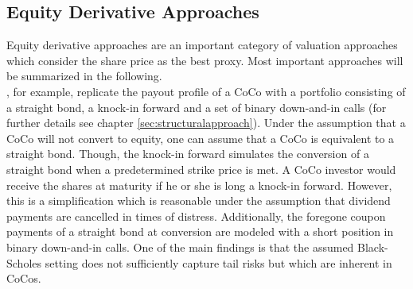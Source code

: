 
\subsection*{Equity Derivative Approaches}
Equity derivative approaches are an important category of valuation approaches which consider the share price as the best proxy. Most important approaches will be summarized in the following.\\

\citet{de2011pricing}, for example, replicate the payout profile of a CoCo with a portfolio consisting of a straight bond, a knock-in forward and a set of binary down-and-in calls (for further details see chapter \ref{sec:structuralapproach}). Under the assumption that a CoCo will not convert to equity, one can assume that a CoCo is equivalent to a straight bond. Though, the knock-in forward simulates the conversion of a straight bond when a predetermined strike price is met. A CoCo investor would receive the shares at maturity if he or she is long a knock-in forward. However, this is a simplification which is reasonable under the assumption that dividend payments are cancelled in times of distress. Additionally, the foregone coupon payments of a straight bond at conversion are modeled with a short position in binary down-and-in calls. One of the main findings is that the assumed Black-Scholes setting does not sufficiently capture tail risks but which are inherent in CoCos.\\

